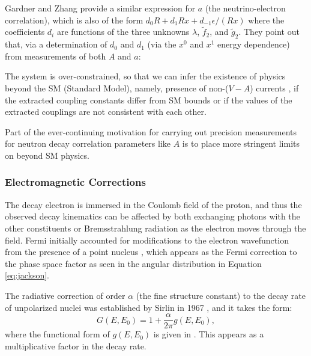 Gardner and Zhang provide a similar expression for $a$ (the neutrino-electron correlation),
which is also of the form $d_0R+d_1Rx+d_{-1}\epsilon/(Rx)$ where the coefficients $d_i$ are functions
of the three unknowns $\lambda$, $\tilde{f}_2$, and $\tilde{g}_2$.
They point out that, via a determination of $d_0$ and
$d_1$ (via the $x^0$ and $x^1$ energy dependence) from measurements of both $A$ and $a$:
%
\begin{displayquote}
  The system is over-constrained, so that we can infer the existence of physics
  beyond the SM (Standard Model), namely, presence of non-($V-A$) currents
  \cite{jackson1957a}, if the extracted coupling constants differ from SM bounds or if the
  values of the extracted couplings are not consistent with each other.
\end{displayquote}
Part of the ever-continuing motivation for carrying out precision measurements for
neutron decay correlation parameters like $A$ is to place more stringent limits on
beyond SM physics.



\subsubsection{Electromagnetic Corrections} \label{sssec:RadCorr}

The decay electron is immersed in the Coulomb field of the proton, and thus the observed
decay kinematics can be affected by both exchanging photons with the other
constituents or Bremsstrahlung radiation as the electron moves through the field.
Fermi initially accounted for modifications to the electron wavefunction from the
presence of a point nucleus \cite{fermi1934versuch,wilkinson1982}, which appears
as the Fermi correction to the phase space factor as seen in the
angular distribution in Equation \ref{eq:jackson}.

The radiative correction of order $\alpha$ (the fine structure constant) to the
decay rate of unpolarized nuclei was established
by Sirlin in 1967 \cite{sirlin1967}, and it takes the form:
%
\begin{equation}
  G(E,E_0) = 1+\frac{\alpha}{2\pi}g(E,E_0),
\end{equation}
where the functional form of $g(E,E_0)$ is given in \cite{sirlin1967}. This appears
as a multiplicative factor in the decay rate.

